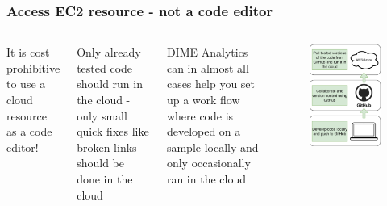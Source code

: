 \documentclass[aspectratio=169]{beamer} %
\begin{document}
\begin{frame}
	\frametitle{Access EC2 resource - not a code editor}
	
	\begin{columns}[c]
		
		It is cost prohibitive to use a cloud resource as a code editor!
		
		\vspace{.5cm}
		
		Only already tested code should run in the cloud - only small quick fixes like broken links should be done in the cloud
		
		\vspace{.5cm}
		
		DIME Analytics can in almost all cases help you set up a work flow where code is developed on a sample locally and only occasionally ran in the cloud
		
		\begin{figure}
			\centering
			\includegraphics[width=.8\textwidth]{./img/code-workflow.png}
		\end{figure}
	\end{columns}
\end{frame}
\end{document}
